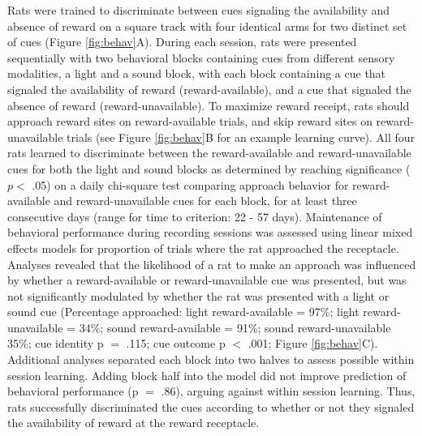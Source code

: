 \documentclass[11pt]{article}
\begin{document}
Rats were trained to discriminate between cues signaling the
availability and absence of reward on a square track with four
identical arms for two distinct set of cues (Figure
\ref{fig:behav}A). During each session, rats were presented sequentially
with two behavioral blocks containing cues from different sensory
modalities, a light and a sound block, with each block containing a
cue that signaled the availability of reward (reward-available), and
a cue that signaled the absence of reward (reward-unavailable). To
maximize reward receipt, rats should approach reward sites on
reward-available trials, and skip reward sites on reward-unavailable
trials (see Figure \ref{fig:behav}B for an example learning
curve). All four rats learned to discriminate between the
reward-available and reward-unavailable cues for both the light and
sound blocks as determined by reaching significance ($p <$ .05) on a
daily chi-square test comparing approach behavior for reward-available
and reward-unavailable cues for each block, for at least three
consecutive days (range for time to criterion: 22 - 57
days). Maintenance of behavioral performance during recording sessions
was assessed using linear mixed effects models for proportion of
trials where the rat approached the receptacle. Analyses revealed that the likelihood of a rat to make an
approach was influenced by whether a reward-available or
reward-unavailable cue was presented, but was not significantly
modulated by whether the rat was presented with a light or sound cue
(Percentage approached: light reward-available = 97\%; light
reward-unavailable = 34\%; sound reward-available = 91\%; sound
reward-unavailable 35\%; cue identity p $=$ .115; cue outcome p $<$
.001; Figure \ref{fig:behav}C). Additional analyses separated each block into two halves to assess possible within session learning. Adding block half into the model did not improve prediction of behavioral performance (p $=$ .86), arguing against within session learning. Thus, rats successfully
discriminated the cues according to whether or not they signaled the
availability of reward at the reward receptacle.
\end{document}
